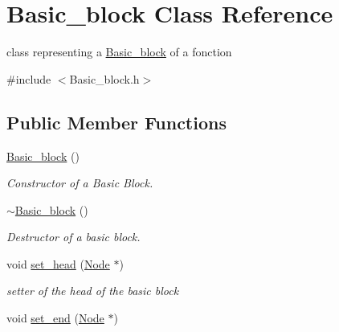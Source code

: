 \hypertarget{class_basic__block}{\section{Basic\-\_\-block Class Reference}
\label{class_basic__block}
}


class representing a \hyperlink{class_basic__block}{Basic\-\_\-block} of a fonction  




{\ttfamily \#include $<$Basic\-\_\-block.\-h$>$}

\subsection*{Public Member Functions}
\begin{DoxyCompactItemize}
\item 
\hypertarget{class_basic__block_aa2455e1b1b8f5ac9b1c128f121fe3d67}{\hyperlink{class_basic__block_aa2455e1b1b8f5ac9b1c128f121fe3d67}{Basic\-\_\-block} ()}\label{class_basic__block_aa2455e1b1b8f5ac9b1c128f121fe3d67}

\begin{DoxyCompactList}\small\item\em Constructor of a Basic Block. \end{DoxyCompactList}\item 
\hypertarget{class_basic__block_a0047b58d9a30fa6eb79a87c70e9176d0}{\hyperlink{class_basic__block_a0047b58d9a30fa6eb79a87c70e9176d0}{$\sim$\-Basic\-\_\-block} ()}\label{class_basic__block_a0047b58d9a30fa6eb79a87c70e9176d0}

\begin{DoxyCompactList}\small\item\em Destructor of a basic block. \end{DoxyCompactList}\item 
\hypertarget{class_basic__block_a1fa279bf9b2750ba0042b1fe87e5c343}{void \hyperlink{class_basic__block_a1fa279bf9b2750ba0042b1fe87e5c343}{set\-\_\-head} (\hyperlink{class_node}{Node} $\ast$)}\label{class_basic__block_a1fa279bf9b2750ba0042b1fe87e5c343}

\begin{DoxyCompactList}\small\item\em setter of the head of the basic block \end{DoxyCompactList}\item 
\hypertarget{class_basic__block_aebf407fc956b148ef145b0a6233d0361}{void \hyperlink{class_basic__block_aebf407fc956b148ef145b0a6233d0361}{set\-\_\-end} (\hyperlink{class_node}{Node} $\ast$)}\label{class_basic__block_aebf407fc956b148ef145b0a6233d0361}


\end{DoxyCompactItemize}

